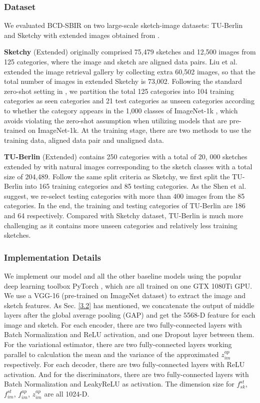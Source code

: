 \documentclass[10pt,twocolumn,letterpaper]{article}
\begin{document}
\subsubsection{Dataset}
We evaluated BCD-SBIR on two large-scale sketch-image datasets: TU-Berlin \cite{eitz2012hdhso} and Sketchy \cite{sangkloy2016sketchy} with extended images obtained from \cite{liu2017deep}.

\textbf{Sketchy} (Extended) \cite{sangkloy2016sketchy} originally comprised 75,479 sketches and 12,500 images from 125 categories, where the image and sketch are aligned data pairs. Liu et al. \cite{liu2017deep} extended the image retrieval gallery by collecting extra 60,502 images, so that the total number of images in extended Sketchy is 73,002. Following the standard zero-shot setting in \cite{yelamarthi2018zero}, we partition the total 125 categories into 104 training categories as seen categories and 21 test categories as unseen categories according to whether the category appears in the 1,000 classes of ImageNet-1k \cite{deng2009imagenet}, which avoids violating the zero-shot assumption when utilizing models that are pre-trained on ImageNet-1k. At the training stage, there are two methods to use the training data, aligned data pair and unaligned data.

\textbf{TU-Berlin} (Extended) \cite{eitz2012hdhso} contains 250 categories with a total of 20, 000 sketches extended by \cite{liu2017deep} with natural images corresponding to the sketch classes with a total size of 204,489. Follow the same split criteria as Sketchy, we first split the TU-Berlin into 165 training categories and 85 testing categories. As the Shen et al. \cite{shen2018zero} suggest, we re-select testing categories with more than 400 images from the 85 categories. In the end, the training and testing categories of TU-Berlin are 186 and 64 respectively. Compared with Sketchy dataset, TU-Berlin is much more challenging as it contains more unseen categories and relatively less training sketches.

\subsubsection{Implementation Details}
We implement our model and all the other baseline models using the popular deep learning toolbox PyTorch \cite{paszke2017automatic}, which are all trained on one GTX 1080Ti GPU. We use a VGG-16 (pre-trained on ImageNet dataset) to extract the image and sketch features. As Sec. \ref{3.2} has mentioned, we concatenate the output of middle layers after the global average pooling (GAP) and get the 5568-D feature for each image and sketch. For each encoder, there are two fully-connected layers with Batch Normalization and ReLU activation, and one Dropout layer between them. For the variational estimator, there are two fully-connected layers working parallel to calculation the mean and the variance of the approximated $z_{im}^{ap}$ respectively. For each decoder, there are two fully-connected layers with ReLU activation. And for the discriminators, there are two fully-connected layers with Batch Normalization and LeakyReLU as activation. The dimension size for $f_{sk}^{st}$, $f_{im}^{st}$, $f_{im}^{ap}$, $z_{im}^{ap}$ are all 1024-D.
\end{document}
